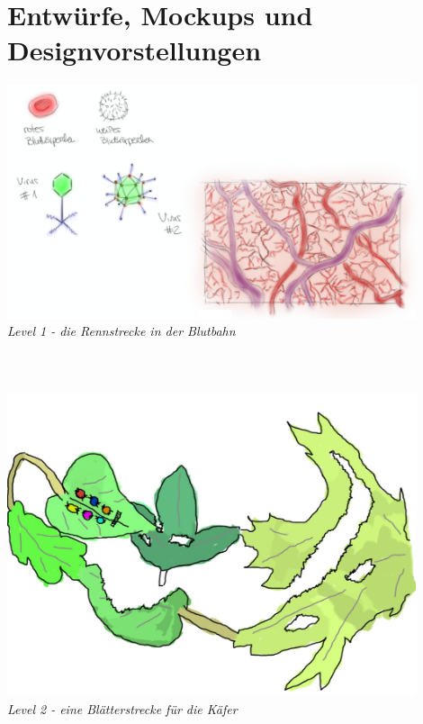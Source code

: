 \newpage

\section{Entwürfe, Mockups und Designvorstellungen}

\begin{flushright}

\includegraphics[width=0.9\textwidth]{img/blutlaufbahn.png}\\
\textit{Level 1 - die Rennstrecke in der Blutbahn}\\
\ \\
\ \\
\ \\
\includegraphics[width=0.9\textwidth]{img/kaefer.png}\\
\textit{Level 2 - eine Blätterstrecke für die Käfer}

\newpage


\end{flushright}
